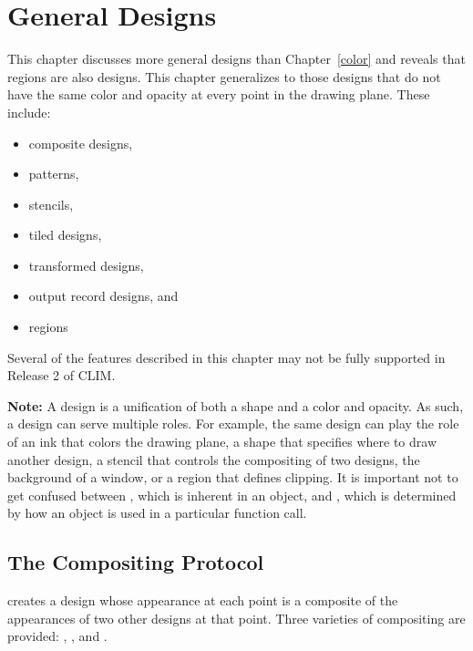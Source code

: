 
\chapter {General Designs}
\label {designs}

This chapter discusses more general designs than Chapter~\ref{color} and reveals
that regions are also designs.  This chapter generalizes to those designs that
do not have the same color and opacity at every point in the drawing plane.
These include:

\begin{itemize}
\item composite designs,

\item patterns,

\item stencils,

\item tiled designs,

\item transformed designs,

\item output record designs, and

\item regions
\end{itemize}

Several of the features described in this chapter may not be fully supported in
Release 2 of CLIM.

{\bf Note:} A design is a unification of both a shape and a color and opacity.
As such, a design can serve multiple roles.  For example, the same design can
play the role of an ink that colors the drawing plane, a shape that specifies
where to draw another design, a stencil that controls the compositing of two
designs, the background of a window, or a region that defines clipping.  It is
important not to get confused between , which is inherent in an
object, and , which is determined by how an object is used in a
particular function call.


\section {The Compositing Protocol}

 creates a design whose appearance at each point is a
composite of the appearances of two other designs at that point.  Three
varieties of compositing are provided: ,
, and .

